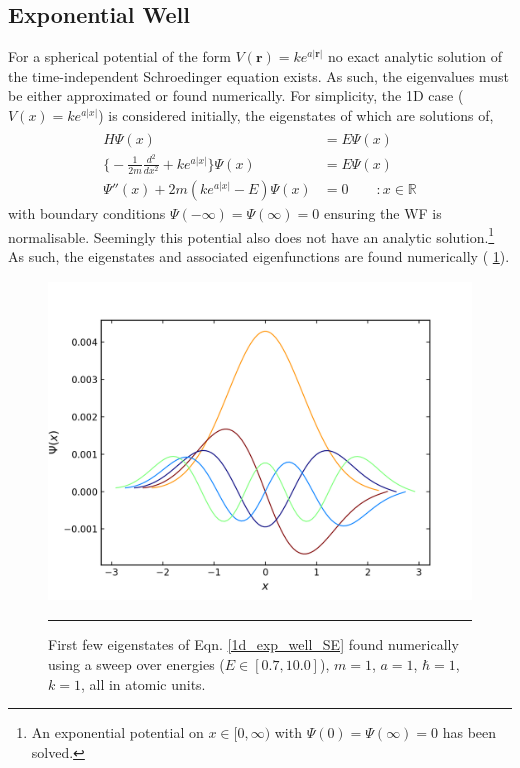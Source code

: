 \documentclass[../main.tex]{subfiles}
\begin{document}
\subsection{Exponential Well}
For a spherical potential of the form $V(\boldsymbol{r}) = k e^{a|\boldsymbol{r}|}$ no exact analytic solution of the time-independent Schroedinger equation exists. As such, the eigenvalues must be either approximated or found numerically. For simplicity, the 1D case ($V(x) = k e^{a|x|}$) is considered initially, the eigenstates of which are solutions of,
\begin{equation}
\begin{aligned}
\hat{H}\Psi(x) &= E \Psi(x) \\
{\Big \{} -\frac{1}{2m} \frac{d^2}{d x^2} + k e^{a|x|} {\Big \}}\Psi(x) &= E\Psi(x) \\ 
\Psi''(x) + 2m(k e^{a|x|} - E)\Psi(x) &= 0 \qquad : x \in \mathbb{R}
\end{aligned}
\label{1d_exp_well_SE}
\end{equation}
with boundary conditions $\Psi(-\infty) =  \Psi(\infty) = 0$ ensuring the WF is normalisable. Seemingly this potential also does not have an analytic solution.\footnote{An exponential potential on $x \in [0, \infty)$ with $\Psi(0)=\Psi(\infty)=0$ has been solved.\cite{Amore2008}} As such, the eigenstates and associated eigenfunctions are found numerically (\figurename{ \ref{wf_1d_exp_well_numerical}}).

\begin{figure}[h!]
	\centering
	\includegraphics[height=8.5cm]{4/figs/wf_1d_exp_well_numerical}
	\vspace{0.2cm}
	\hrule
	\caption{First few eigenstates of Eqn. \eqref{1d_exp_well_SE} found numerically using a sweep over energies ($E \in [0.7, 10.0]$), $m=1$, $a = 1$, $\hbar = 1$, $k = 1$, all in atomic units.} 
	\label{wf_1d_exp_well_numerical}
\end{figure}
\end{document}
